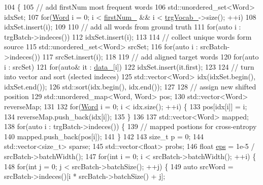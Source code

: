\begin{DoxyCode}
104                                                          \{
105     \textcolor{comment}{// add firstNum most frequent words}
106     std::unordered\_set<Word> idxSet;
107     \textcolor{keywordflow}{for}(\hyperlink{namespacemarian_a5db8bee455c97a62d6a525dc48efe4c2}{Word} i = 0; i < \hyperlink{classmarian_1_1Filter_ae7cffff59aba67252377a48d9f3b4bc4}{firstNum\_} && i < \hyperlink{classmarian_1_1Filter_a2003fa017c08e47172cf1f102ec0e9be}{trgVocab\_}->size(); ++i)
108       idxSet.insert(i);
109 
110     \textcolor{comment}{// add all words from ground truth}
111     \textcolor{keywordflow}{for}(\textcolor{keyword}{auto} i : trgBatch->indeces())
112       idxSet.insert(i);
113 
114     \textcolor{comment}{// collect unique words form source}
115     std::unordered\_set<Word> srcSet;
116     \textcolor{keywordflow}{for}(\textcolor{keyword}{auto} i : srcBatch->indeces())
117       srcSet.insert(i);
118 
119     \textcolor{comment}{// add aligned target words}
120     \textcolor{keywordflow}{for}(\textcolor{keyword}{auto} i : srcSet)
121       \textcolor{keywordflow}{for}(\textcolor{keyword}{auto}& it : \hyperlink{classmarian_1_1Filter_aad459e8cec49017a0d60e158bdd4b8e6}{data\_}[i])
122         idxSet.insert(it.first);
123 
124     \textcolor{comment}{// turn into vector and sort (slected indeces)}
125     std::vector<Word> idx(idxSet.begin(), idxSet.end());
126     std::sort(idx.begin(), idx.end());
127 
128     \textcolor{comment}{// assign new shifted position}
129     std::unordered\_map<Word, Word> pos;
130     std::vector<Word> reverseMap;
131 
132     \textcolor{keywordflow}{for}(\hyperlink{namespacemarian_a5db8bee455c97a62d6a525dc48efe4c2}{Word} i = 0; i < idx.size(); ++i) \{
133       pos[idx[i]] = i;
134       reverseMap.push\_back(idx[i]);
135     \}
136 
137     std::vector<Word> mapped;
138     \textcolor{keywordflow}{for}(\textcolor{keyword}{auto} i : trgBatch->indeces()) \{
139       \textcolor{comment}{// mapped postions for cross-entropy}
140       mapped.push\_back(pos[i]);
141     \}
142 
143     \textcolor{keywordtype}{size\_t} p = 0;
144     std::vector<size\_t> sparse;
145     std::vector<float> probs;
146     \textcolor{keywordtype}{float} \hyperlink{namespacemarian_1_1keywords_a94a12c2471667d9574d8b013796ec1cc}{eps} = 1e-5 / srcBatch->batchWidth();
147     \textcolor{keywordflow}{for}(\textcolor{keywordtype}{int} i = 0; i < srcBatch->batchWidth(); ++i) \{
148       \textcolor{keywordflow}{for}(\textcolor{keywordtype}{int} j = 0; j < srcBatch->batchSize(); ++j) \{
149         \textcolor{keyword}{auto} srcWord = srcBatch->indeces()[i * srcBatch->batchSize() + j];

\end{DoxyCode}
